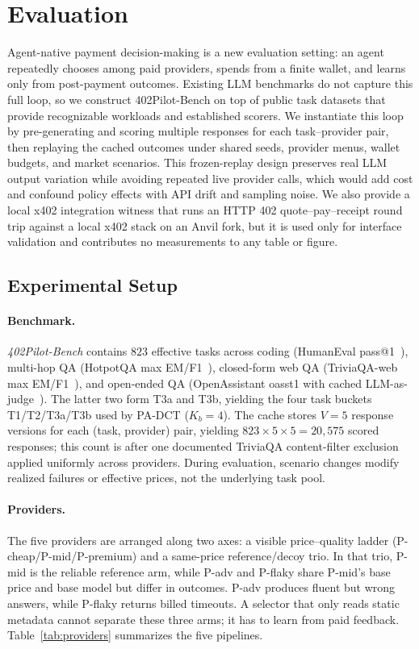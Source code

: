\section{Evaluation}
\label{sec:eval}

Agent-native payment decision-making is a new evaluation setting: an agent repeatedly chooses among paid providers, spends from a finite wallet, and learns only from post-payment outcomes. Existing LLM benchmarks do not capture this full loop, so we construct 402Pilot-Bench on top of public task datasets that provide recognizable workloads and established scorers. We instantiate this loop by pre-generating and scoring multiple responses for each task--provider pair, then replaying the cached outcomes under shared seeds, provider menus, wallet budgets, and market scenarios. This frozen-replay design preserves real LLM output variation while avoiding repeated live provider calls, which would add cost and confound policy effects with API drift and sampling noise. We also provide a local x402 integration witness that runs an HTTP 402 quote--pay--receipt round trip against a local x402 stack on an Anvil fork, but it is used only for interface validation and contributes no measurements to any table or figure.

\subsection{Experimental Setup}
\label{sec:eval-setup}

\paragraph{Benchmark.}
\emph{402Pilot-Bench} contains $823$ effective tasks across coding (HumanEval pass@1~\citep{chen2021humaneval}), multi-hop QA (HotpotQA max EM/F1~\citep{yang2018hotpotqa}), closed-form web QA (TriviaQA-web max EM/F1~\citep{joshi2017triviaqa}), and open-ended QA (OpenAssistant oasst1 with cached LLM-as-judge~\citep{kopf2023openassistant}). The latter two form T3a and T3b, yielding the four task buckets T1/T2/T3a/T3b used by PA-DCT ($K_b=4$). The cache stores $V=5$ response versions for each (task, provider) pair, yielding $823\times5\times5=20{,}575$ scored responses; this count is after one documented TriviaQA content-filter exclusion applied uniformly across providers. During evaluation, scenario changes modify realized failures or effective prices, not the underlying task pool.

\paragraph{Providers.}
The five providers are arranged along two axes: a visible price--quality ladder (P-cheap/P-mid/P-premium) and a same-price reference/decoy trio. In that trio, P-mid is the reliable reference arm, while P-adv and P-flaky share P-mid's base price and base model but differ in outcomes. P-adv produces fluent but wrong answers, while P-flaky returns billed timeouts. A selector that only reads static metadata cannot separate these three arms; it has to learn from paid feedback. Table~\ref{tab:providers} summarizes the five pipelines.

